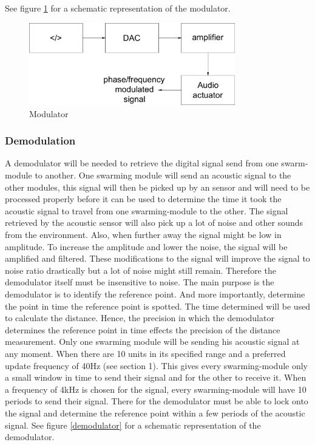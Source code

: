 \documentclass[10pt,a4paper]{article}
\begin{document}
See figure \ref{modulator} for a schematic representation of the modulator.

\begin{figure}[H]
  \centering
      \includegraphics[width=0.8\textwidth]{modulator2.pdf}
  \caption{Modulator}
  \label{modulator}
\end{figure}

\subsubsection{Demodulation}

A demodulator will be needed to retrieve the digital signal send from one swarm-module to another.  One swarming module will send an acoustic signal to the other modules, this signal will then be picked up by an sensor and will need to be processed properly before it can be used to determine the time it took the acoustic signal to travel from one swarming-module to the other. The signal retrieved by the acoustic sensor will also pick up a lot of noise and other sounds from the environment. Also, when further away the signal might be low in amplitude. To increase the amplitude and lower the noise, the signal will be amplified and filtered. These modifications to the signal will improve the signal to noise ratio drastically but a lot of noise might still remain. Therefore the demodulator itself must be insensitive to noise.  
The main purpose is the demodulator is to identify the reference point. And more importantly, determine the point in time the reference point is spotted. The time determined will be used to calculate the distance. Hence, the precision in which the demodulator determines the reference point in time effects the precision of the distance measurement. Only one swarming module will be sending his acoustic signal at any moment. When there are 10 units in its specified range and a preferred update frequency of 40Hz (see section 1). This gives every swarming-module only a small window in time to send their signal and for the other to receive it. When a frequency of 4kHz is chosen for the signal, every swarming-module will have 10 periods to send their signal. There for the demodulator must be able to lock onto the signal and determine the reference point within a few periods of the acoustic signal. See figure \ref{demodulator} for a schematic representation of the demodulator.
\end{document}
